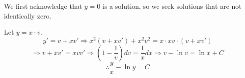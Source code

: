 \item

We first acknowledge that $y=0$ is a solution, so we seek solutions that are not identically zero.

Let $y = x \cdot v$.
\[
	y' = v + xv'
	\Rightarrow x^2 (v + xv') + x^2 v^2 = x \cdot xv \cdot (v + xv')
\]
\[
	\Rightarrow v + xv' = xvv'
	\Rightarrow \left( 1 - \frac{1}{v} \right) dv = \frac{1}{x} dx
	\Rightarrow v - \ln v = \ln x + C
\]
\[
	\therefore \frac{y}{x} - \ln y = C
\]
